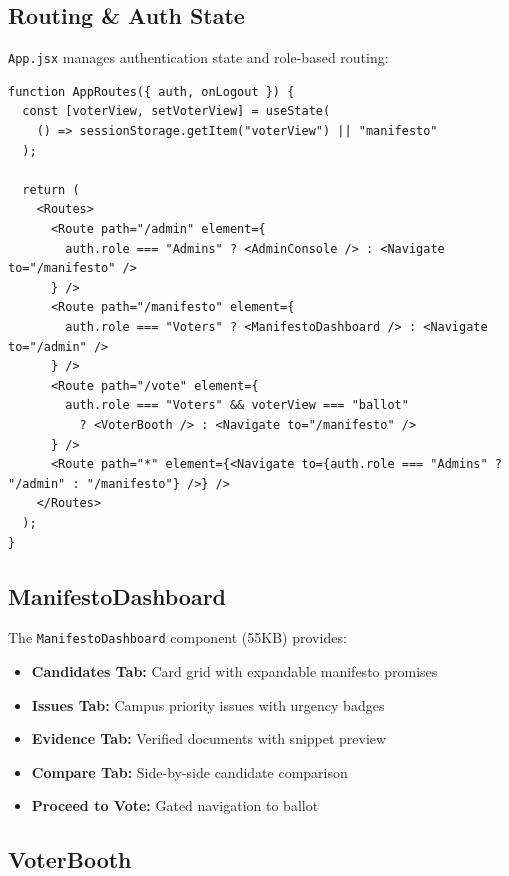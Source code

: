 \subsection{Routing \& Auth State}
\label{sec:routing}

\texttt{App.jsx} manages authentication state and role-based routing:

\begin{lstlisting}[style=codeStyle, caption=App.jsx routing logic, label=lst:app-routing]
function AppRoutes({ auth, onLogout }) {
  const [voterView, setVoterView] = useState(
    () => sessionStorage.getItem("voterView") || "manifesto"
  );

  return (
    <Routes>
      <Route path="/admin" element={
        auth.role === "Admins" ? <AdminConsole /> : <Navigate to="/manifesto" />
      } />
      <Route path="/manifesto" element={
        auth.role === "Voters" ? <ManifestoDashboard /> : <Navigate to="/admin" />
      } />
      <Route path="/vote" element={
        auth.role === "Voters" && voterView === "ballot"
          ? <VoterBooth /> : <Navigate to="/manifesto" />
      } />
      <Route path="*" element={<Navigate to={auth.role === "Admins" ? "/admin" : "/manifesto"} />} />
    </Routes>
  );
}
\end{lstlisting}

\subsection{ManifestoDashboard}
\label{sec:manifesto-dash}

The \texttt{ManifestoDashboard} component (55KB) provides:
\begin{itemize}
    \item \textbf{Candidates Tab:} Card grid with expandable manifesto promises
    \item \textbf{Issues Tab:} Campus priority issues with urgency badges
    \item \textbf{Evidence Tab:} Verified documents with snippet preview
    \item \textbf{Compare Tab:} Side-by-side candidate comparison
    \item \textbf{Proceed to Vote:} Gated navigation to ballot
\end{itemize}

\subsection{VoterBooth}
\label{sec:voter-booth}

